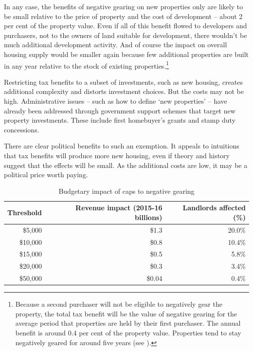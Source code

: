 In any case, the benefits of negative gearing on new properties only are likely to be small relative to the price of property and the cost of development – about 2 per cent of the property value.  Even if all of this benefit flowed to developers and purchasers, not to the owners of land suitable for development, there wouldn’t be much additional development activity. And of course the impact on overall housing supply would be smaller again because few additional properties are built in any year relative to the stock of existing properties.\footnote{Because a second purchaser will not be eligible to negatively gear the property, the total tax benefit will be the value of negative gearing for the average period that properties are held by their first purchaser. The annual benefit is around 0.4 per cent of the property value. Properties tend to stay negatively geared for around five years (see \stopifendnote{}).} 

Restricting tax benefits to a subset of investments, such as new housing, creates additional complexity and distorts investment choices. But the costs may not be high. Administrative issues -- such as how to define ‘new properties’ -- have already been addressed through government support schemes that target new property investments. These include first homebuyer’s grants and stamp duty concessions. 

There are clear political benefits to such an exemption.  It appeals to intuitions that tax benefits will produce more new housing, even if theory and history suggest that the effects will be small.  As the additional costs are low, it may be a political price worth paying.

\begin{table}
\caption{Budgetary impact of caps to negative gearing}\label{tbl:cap-NG}
\centering
\begin{tabularx}{0.80\linewidth}{rRR}
  \toprule
{\textbf{Threshold}} & {\textbf{Revenue impact (2015-16 billions)}} & {\textbf{Landlords affected (\%)}} \\ 
  \midrule
  \$5,000 & \$1.3\phantom{0} &  20.0\% \\ 
  \$10,000 & \$0.8\phantom{0} &  10.4\% \\ 
  \$15,000 & \$0.5\phantom{0} &  5.8\% \\ 
  \$20,000 & \$0.3\phantom{0} & 3.4\% \\ 
  \$50,000 & \$0.04 & 0.4\% \\ 
   \bottomrule
\end{tabularx}

\end{table}

